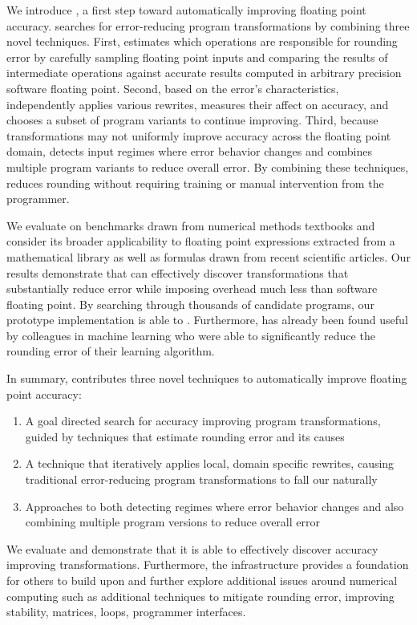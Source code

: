 \documentclass[paper.tex]{subfiles}
\begin{document}
We introduce \casio, a first step toward automatically improving
floating point accuracy.  \casio searches for error-reducing program
transformations by combining three novel techniques.  First, \casio
estimates which operations are responsible for rounding error by
carefully sampling floating point inputs and comparing the results of
intermediate operations against accurate results computed in arbitrary
precision software floating point.  Second, based on the error's
characteristics, \casio independently applies various rewrites,
measures their affect on accuracy, and chooses a subset of program
variants to continue improving.  Third, because transformations may
not uniformly improve accuracy across the floating point domain,
\casio detects input regimes where error behavior changes and combines
multiple program variants to reduce overall error.  By combining these
techniques, \casio reduces rounding without requiring training or
manual intervention from the programmer.

We evaluate \casio on benchmarks drawn from numerical methods
textbooks and consider its broader applicability to floating point
expressions extracted from a mathematical library as well as formulas
drawn from recent scientific articles.  Our results demonstrate that
\casio can effectively discover transformations that substantially
reduce error while imposing overhead much less than software floating
point.  By searching through thousands of candidate programs, our
prototype implementation is able to .  Furthermore, \casio has already been found useful by
colleagues in machine learning who were able to significantly reduce
the rounding error of their learning algorithm. 

In summary, \casio contributes three novel techniques to automatically
improve floating point accuracy:
\begin{enumerate}
\item A goal directed search for accuracy improving program
  transformations, guided by techniques that estimate rounding error
  and its causes
\item A technique that iteratively applies local, domain specific
  rewrites, causing traditional error-reducing program transformations
  to fall our naturally
\item Approaches to both detecting regimes where error behavior
  changes and also combining multiple program versions to reduce
  overall error
\end{enumerate}
We evaluate \casio and demonstrate that it is able to effectively
discover accuracy improving transformations.  Furthermore, the \casio
infrastructure provides a foundation for others to build upon and
further explore additional issues around numerical computing such as
additional techniques to mitigate rounding error, improving stability,
matrices, loops, programmer interfaces.
\end{document}
